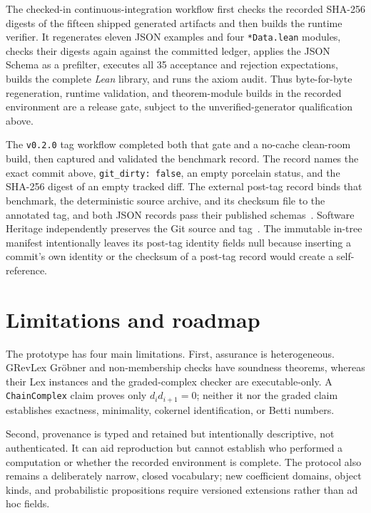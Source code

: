 \documentclass[11pt]{article}
\newcommand{\lean}{\textit{Lean}}
\newcommand{\code}[1]{\texttt{#1}}
\begin{document}
The checked-in continuous-integration workflow first checks the recorded
SHA-256 digests of the fifteen shipped generated artifacts and then builds
the runtime verifier.  It regenerates eleven JSON examples and four
\code{*Data.lean} modules, checks their digests again against the committed
ledger, applies the JSON Schema as a prefilter, executes all 35 acceptance and
rejection expectations, builds the complete \lean{} library, and runs the
axiom audit.  Thus byte-for-byte regeneration, runtime validation, and
theorem-module builds in the recorded environment are a release gate,
subject to the unverified-generator qualification above.

The \code{v0.2.0} tag workflow completed both that gate and a no-cache
clean-room build, then captured and validated the benchmark record.  The
record names the exact commit above, \code{git\_dirty: false}, an empty
porcelain status, and the SHA-256 digest of an empty tracked diff.  The
external post-tag record binds that benchmark, the deterministic source
archive, and its checksum file to the annotated tag, and both JSON records
pass their published schemas~\cite{m2lean-benchmark}.  Software Heritage
independently preserves the Git source and tag~\cite{m2lean-repo}.  The
immutable in-tree manifest intentionally leaves its post-tag identity fields
null because inserting a commit's own identity or the checksum of a
post-tag record would create a self-reference.

\section{Limitations and roadmap}\label{sec:roadmap}

The prototype has four main limitations.  First, assurance is
heterogeneous.  GRevLex Gr\"obner and non-membership checks have
soundness theorems, whereas their Lex instances and the
graded-complex checker are executable-only.  A \code{ChainComplex}
claim proves only $d_i d_{i+1}=0$; neither it nor the graded claim
establishes exactness, minimality, cokernel identification, or Betti
numbers.

Second, provenance is typed and retained but intentionally descriptive,
not authenticated.  It can aid reproduction but cannot establish who
performed a computation or whether the recorded environment is complete.
The protocol also remains a deliberately narrow, closed vocabulary; new
coefficient domains, object kinds, and probabilistic propositions require
versioned extensions rather than ad hoc fields.
\end{document}
